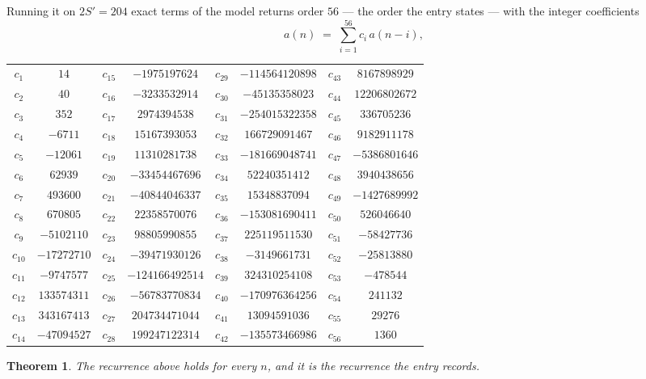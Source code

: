 \documentclass[11pt,a4paper]{article}
\theoremstyle{plain}
\newtheorem{theorem}{Theorem}
\theoremstyle{definition}
\begin{document}
Running it on $2S'=204$ exact terms of the model returns order $56$ --- the order the
entry states --- with the integer coefficients
\[
a(n)\;=\;\sum_{i=1}^{56}c_i\,a(n-i),
\]
\begin{center}\small
\begin{tabular}{cccccccc}
$c_{1}$ & $14$ & $c_{15}$ & $-1975197624$ & $c_{29}$ & $-114564120898$ & $c_{43}$ & $8167898929$ \\
$c_{2}$ & $40$ & $c_{16}$ & $-3233532914$ & $c_{30}$ & $-45135358023$ & $c_{44}$ & $12206802672$ \\
$c_{3}$ & $352$ & $c_{17}$ & $2974394538$ & $c_{31}$ & $-254015322358$ & $c_{45}$ & $336705236$ \\
$c_{4}$ & $-6711$ & $c_{18}$ & $15167393053$ & $c_{32}$ & $166729091467$ & $c_{46}$ & $9182911178$ \\
$c_{5}$ & $-12061$ & $c_{19}$ & $11310281738$ & $c_{33}$ & $-181669048741$ & $c_{47}$ & $-5386801646$ \\
$c_{6}$ & $62939$ & $c_{20}$ & $-33454467696$ & $c_{34}$ & $52240351412$ & $c_{48}$ & $3940438656$ \\
$c_{7}$ & $493600$ & $c_{21}$ & $-40844046337$ & $c_{35}$ & $15348837094$ & $c_{49}$ & $-1427689992$ \\
$c_{8}$ & $670805$ & $c_{22}$ & $22358570076$ & $c_{36}$ & $-153081690411$ & $c_{50}$ & $526046640$ \\
$c_{9}$ & $-5102110$ & $c_{23}$ & $98805990855$ & $c_{37}$ & $225119511530$ & $c_{51}$ & $-58427736$ \\
$c_{10}$ & $-17272710$ & $c_{24}$ & $-39471930126$ & $c_{38}$ & $-3149661731$ & $c_{52}$ & $-25813880$ \\
$c_{11}$ & $-9747577$ & $c_{25}$ & $-124166492514$ & $c_{39}$ & $324310254108$ & $c_{53}$ & $-478544$ \\
$c_{12}$ & $133574311$ & $c_{26}$ & $-56783770834$ & $c_{40}$ & $-170976364256$ & $c_{54}$ & $241132$ \\
$c_{13}$ & $343167413$ & $c_{27}$ & $204734471044$ & $c_{41}$ & $13094591036$ & $c_{55}$ & $29276$ \\
$c_{14}$ & $-47094527$ & $c_{28}$ & $199247122314$ & $c_{42}$ & $-135573466986$ & $c_{56}$ & $1360$ \\
\end{tabular}
\end{center}

\begin{theorem}
The recurrence above holds for every $n$, and it is the recurrence the entry records.
\end{theorem}
\end{document}
